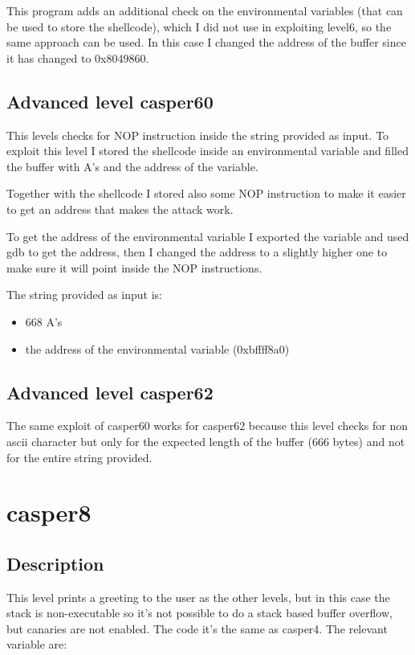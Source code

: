 \documentclass[a4paper,12pt]{article}
\begin{document}
This program adds an additional check on the environmental variables (that can be used to store the shellcode), which I did not use in exploiting level6, so the same approach can be used. In this case I changed the address of the buffer since it has changed to 0x8049860.

\subsection{Advanced level casper60}

This levels checks for NOP instruction inside the string provided as input. To exploit this level I stored the shellcode inside an environmental variable and filled the buffer with A's and the address of the variable.

Together with the shellcode I stored also some NOP instruction to make it easier to get an address that makes the attack work.

To get the address of the environmental variable I exported the variable and used gdb to get the address, then I changed the address to a slightly higher one to make sure it will point inside the NOP instructions.

The string provided as input is:
\begin{itemize}
\item 668 A's
\item the address of the environmental variable (0xbffff8a0)
\end{itemize}

\subsection{Advanced level casper62}

The same exploit of casper60 works for casper62 because this level checks for non ascii character but only for the expected length of the buffer (666 bytes) and not for the entire string provided.

\section{casper8}
\subsection{Description}

This level prints a greeting to the user as the other levels, but in this case the stack is non-executable so it's not possible to do a stack based buffer overflow, but canaries are not enabled. The code it's the same as casper4.
The relevant variable are:
\end{document}
